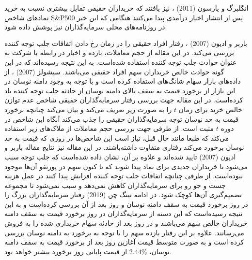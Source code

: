 \documentclass[12pt]{article}
\begin{document}
انگلبرگ و پارسون (2011)
\cite{r5}
،
نیز یافتند که خریداران حقیقی تمایل بیشتری نسبت به خرید نماد‌های شاخص  S\&P500
پس از انتشار اخبار درآمدی پیدا می‌کنند هنگامی که این خبر در روزنامه‌های محلی سرمایه‌گذاران نیز پوشش داده شود.

باربر و ادیون (2007)
\cite{r3}
،
رفتار افراد حقیقی را در زمان رخ دادن اتفاقات جلب توجه کننده بررسی می‌کند. در این مقاله از حجم معاملات، بازده و اخبار در رابطه با شرکت به عنوان حوادث جلب توجه کننده استفاده شده‌است. به این نتیجه رسیده‌اند که در این گونه حوادث خالص خریداران سهم افراد حقیقی 
می‌باشند.
سیشولز (2007)
\cite{r2}
،
از داده‌های بازار سهام شانگ‌های استفاده کرده است و با توجه به وجود دامنه نوسان در این بازار از برخورد قیمت به سقف بالای دامنه نوسان از حادثه جلب توجه کننده یاد کرده‌است. در این مقاله جهت بررسی رفتار سرمایه‌گذاران حقیقی شاخص عدم توازن خالص خرید برای زمان $ t $ را به صورت زیر تعریف می‌کند
و بیان می‌کند چنانچه برخورد قیمت به حد نوسان توجه سرمایه‌گذاران حقیقی را جذب می‌کند آنگاه این شاخص در دوره $ t $ مثبت است.
از طرفی جهت بررسی حجم معاملات از ملاک‌های زیر استفاده می‌کند که طبعا مانند حال قبل، نیاز است این شاخص‌ها در روزی که قیمت به حد نوسان برخورد می‌کند رفتاری متفاوت داشته‌باشند.
در این مقاله نیز نتایج مقاله 
باربر و ادیون (2007)
\cite{r3}
تایید شده‌اند و علاوه بر آن، نشان داده شده‌است که جلب توجه سبب می‌شود تا خریداران جدیدی برای نماد پیدا شوند که تا کنون سهم در پورتفو آن‌ها موجود نبوده‌است. از طرفی چنانچه اتفاقات جلب توجه کننده افزایش پیدا کنند در عمل هزینه جست و جو رو برای سرمایه‌گذاران کاهش نمی‌دهد و سبب نمی‌شود تا مجموعه تصمیم‌گیری آن‌ها کوچک شود.
در ادامه تینگ چن (2019)
\cite{r4}
رفتار سرمایه‌گذاران بزرگ را در روز برخورد قیمت به سقف دامنه نوسان و روز بعد از آن بررسی کرده‌است و به این نتیجه رسیده‌است که این دسته از سرمایه‌گذاران در روز برخورد قیمت به سقف دامنه خریداران خالص سهم می‌باشند و در روز بعد از حادثه سهام خریداری شده را به فروش می‌رسانند. علاوه بر  این رفتار بازده سهم را با توجه به برخورد به دامنه نوسان بررسی کرده است و به صورت متوسط قیمت آغازین روز بعد از برخورد قیمت به سقف دامنه نوسان، $ 2.44\% $ از قیمت پایانی روز برخورد بیشتر خواهد بود.
\end{document}
